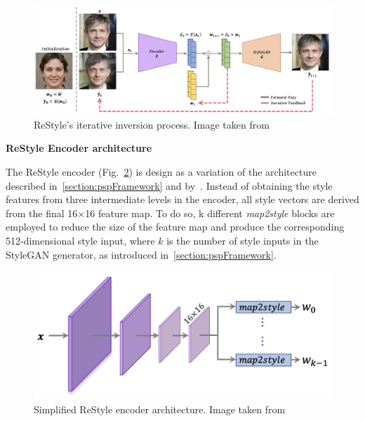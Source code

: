  \begin{figure}[htbp]
\centering
  \includegraphics[scale=0.3]{figures/restyle-inversionScheme.png}
  \caption{ReStyle's iterative inversion process. Image taken from~\cite{alaluf2021restyle}}
  \label{fig:ReStyle inversion scheme}
\end{figure}

\noindent \textbf{ReStyle Encoder architecture}

\noindent The ReStyle encoder (Fig.~\ref{fig:ReStyle encoder architecture}) is design as a variation of the architecture described in~\ref{section:pspFramework} and by~\cite{e4e}. Instead of obtaining the style features from three intermediate levels in the encoder, all style vectors are derived from the final 16×16 feature map. To do so, k different \textit{map2style} blocks are employed to reduce the size of the feature map and produce the corresponding \num{512}-dimensional style input, where $k$ is the number of style inputs in the StyleGAN generator, as introduced in~\ref{section:pspFramework}.\\
 \begin{figure}[htbp]
\centering
  \includegraphics[scale=0.5]{figures/restyle-encoderArchitecture.png}
  \caption{Simplified ReStyle encoder architecture. Image taken from~\cite{alaluf2021restyle}}
  \label{fig:ReStyle encoder architecture}
\end{figure}


